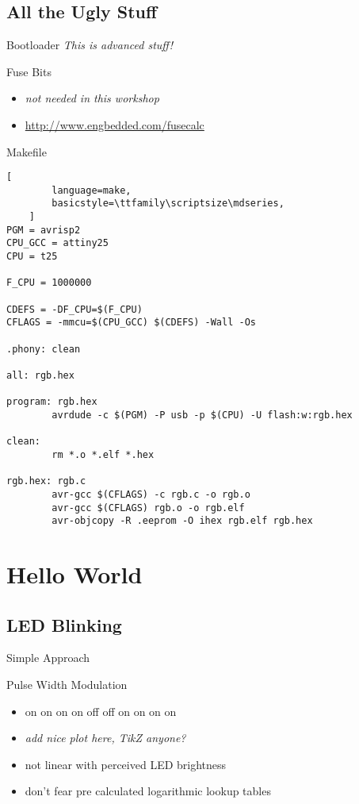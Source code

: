 \documentclass{beamer}
\begin{document}
\subsection{All the Ugly Stuff}

\begin{frame}{Bootloader}
    \emph{This is advanced stuff!}
\end{frame}

\begin{frame}{Fuse Bits}
    \begin{itemize}
        \item \emph{not needed in this workshop}
        \pause
        \item \url{http://www.engbedded.com/fusecalc}
    \end{itemize}
\end{frame}

\begin{frame}[fragile]{Makefile}
    \begin{lstlisting}[
        language=make,
        basicstyle=\ttfamily\scriptsize\mdseries,
    ]
PGM = avrisp2
CPU_GCC = attiny25
CPU = t25

F_CPU = 1000000

CDEFS = -DF_CPU=$(F_CPU)
CFLAGS = -mmcu=$(CPU_GCC) $(CDEFS) -Wall -Os

.phony: clean

all: rgb.hex

program: rgb.hex
        avrdude -c $(PGM) -P usb -p $(CPU) -U flash:w:rgb.hex

clean:
        rm *.o *.elf *.hex

rgb.hex: rgb.c
        avr-gcc $(CFLAGS) -c rgb.c -o rgb.o
        avr-gcc $(CFLAGS) rgb.o -o rgb.elf
        avr-objcopy -R .eeprom -O ihex rgb.elf rgb.hex
    \end{lstlisting}
\end{frame}

\section{Hello World}

\subsection{LED Blinking}

\begin{frame}{Simple Approach}
\end{frame}

\begin{frame}{Pulse Width Modulation}
    \begin{itemize}
        \item on on on on off off on on on on
        \pause
        \item \emph{add nice plot here, TikZ anyone?}
        \pause
        \item not linear with perceived LED brightness
        \item don't fear pre calculated logarithmic lookup tables
    \end{itemize}
\end{frame}
\end{document}
